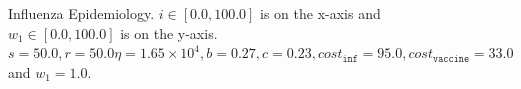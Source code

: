 \begin{figure}[h!]
    \centering
    \caption{Influenza Epidemiology. $ i \in \left[ 0.0, 100.0 \right]$ is on the x-axis and $ w_1 \in \left[ 0.0, 100.0 \right]$ is on the y-axis. $ s = 50.0, r = 50.0 \eta = 1.65 \times 10^4, b = 0.27, c = 0.23, cost_{\mathtt{inf}} = 95.0, cost_{\mathtt{vaccine}} = 33.0$ and $w_1 = 1.0 $.}
    \label{fig:robot1d}
\end{figure}

